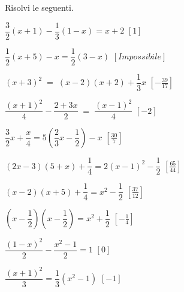 \begin{esercizio}[\Ast]
\label{ese:13.36}
Risolvi le seguenti.
\begin{multicols}{2}
\begin{enumeratea}
\spazielenx
 \item $\dfrac{3}{2}(x+1)-\dfrac{1}{3}(1-x)=x+2$ 
  \hfill $\left[1\right]$
 \item $\dfrac{1}{2}(x+5)-x=\dfrac{1}{2}(3-x)$ 
  \hfill $\left[Impossibile\right]$
 \item $(x+3)^{2}\;=\;(x-2)(x+2)+\dfrac{1}{3}x$ 
  \hfill $\left[-{\frac{39}{17}}\right]$
 \item $\dfrac{(x+1)^{2}}{4}-\dfrac{2+3x}{2}\;=\;\dfrac{(x-1)^{2}}{4}$ 
  \hfill $\left[-2\right]$
 \item $\dfrac{3}{2}x+\dfrac{x}{4}=5\left(\dfrac{2}{3}x-\dfrac{1}{2}\right)-x$
  \hfill $\left[\frac{30}{7}\right]$
 \item $(2x-3)(5+x)+\dfrac{1}{4}=2(x-1)^{2}-\dfrac{1}{2}$ 
  \hfill $\left[\frac{65}{44}\right]$
 \item $(x-2)(x+5)+\dfrac{1}{4}=x^{2}-\dfrac{1}{2}$ 
  \hfill $\left[\frac{37}{12}\right]$
 \item $\left(x-\dfrac{1}{2}\right)\left(x-\dfrac{1}{2}\right)=
        x^{2}+\dfrac{1}{2}$ \hfill $\left[-{\frac{1}{4}}\right]$
 \item $\dfrac{(1-x)^{2}}{2}-\dfrac{x^{2}-1}{2}=1$ \hfill $\left[0\right]$
 \item $\dfrac{(x+1)^{2}}{3}=\dfrac{1}{3}(x^{2}-1)$ \hfill $\left[-1\right]$
\end{enumeratea}
\end{multicols}
\end{esercizio}


